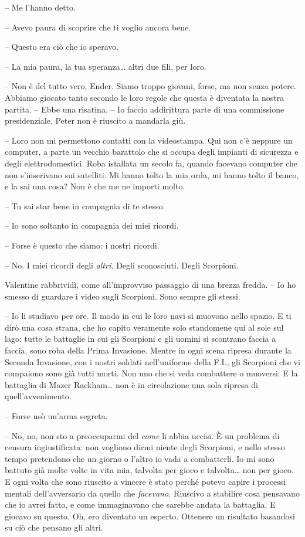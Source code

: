 {-- Me l'hanno detto.}

{-- Avevo paura di scoprire che ti voglio ancora bene.}

{-- Questo era ciò che io speravo.}

{-- La mia paura, la tua speranza\ldots{} altri due fili, per loro.}

{-- Non è del tutto vero, Ender. Siamo troppo giovani, forse, ma non
	senza potere. Abbiamo giocato tanto secondo le loro regole che questa è
	diventata la nostra partita. -- Ebbe una risatina. -- Io faccio
	addirittura parte di una commissione presidenziale. Peter non è riuscito
	a mandarla giù.}

{-- Loro non mi permettono contatti con la videostampa. Qui non c'è
	neppure un computer, a parte un vecchio barattolo che si occupa degli
	impianti di sicurezza e degli elettrodomestici. Roba istallata un secolo
	fa, quando facevano computer che non s'inserivano sui satelliti. Mi
	hanno tolto la mia orda, mi hanno tolto il banco, e la sai una cosa? Non
	è che me ne importi molto.}

{-- Tu sai star bene in compagnia di te stesso.}

{-- Io sono soltanto in compagnia dei miei ricordi.}

{-- Forse è questo che siamo: i nostri ricordi.}

{-- No. I miei ricordi degli \emph{altri.} Degli sconosciuti. Degli
	Scorpioni.}

{Valentine rabbrividì, come all'improvviso passaggio di una brezza
	fredda. -- Io ho smesso di guardare i video sugli Scorpioni. Sono sempre
	gli stessi.}

{-- Io li studiavo per ore. Il modo in cui le loro navi si muovono nello
	spazio. E ti dirò una cosa strana, che ho capito veramente solo
	standomene qui al sole sul lago: tutte le battaglie in cui gli Scorpioni
	e gli uomini si scontrano faccia a faccia, sono roba della Prima
	Invasione. Mentre in ogni scena ripresa durante la Seconda Invasione,
	con i nostri soldati nell'uniforme della F.I., gli Scorpioni che vi
	compaiono sono già tutti morti. Non uno che si veda combattere o
	muoversi. E la battaglia di Mazer Rackham\ldots{} non è in circolazione
	una sola ripresa di quell'avvenimento.}

{-- Forse usò un'arma segreta.}

{-- No, no, non sto a preoccuparmi del \emph{come} li abbia uccisi. È un
	problema di censura ingiustificata: non vogliono dirmi niente degli
	Scorpioni, e nello stesso tempo pretendono che un giorno o l'altro io
	vada a combatterli. Io mi sono battuto già molte volte in vita mia,
	talvolta per gioco e talvolta\ldots{} non per gioco. E ogni volta che
	sono riuscito a vincere è stato perché potevo capire i processi mentali
	dell'avversario da quello che \emph{facevano.} Riuscivo a stabilire cosa
	pensavano che io avrei fatto, e come immaginavano che sarebbe andata la
	battaglia. E giocavo su questo. Oh, ero diventato un esperto. Ottenere
	un risultato basandosi su ciò che pensano gli altri.}

